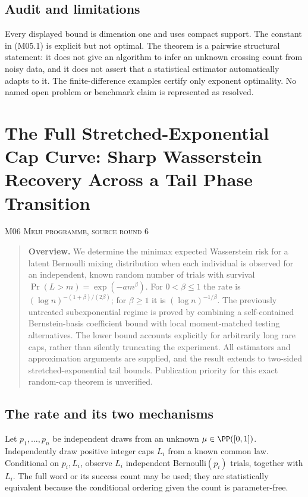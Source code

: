 \documentclass[11pt,a4paper]{article}
\theoremstyle{definition}\newtheorem{definition}[theorem]{Definition}
\theoremstyle{remark}\newtheorem{remark}[theorem]{Remark}
\numberwithin{equation}{section}
\begin{document}
\subsection{Audit and limitations}\label{M05-sec-6}
Every displayed bound is dimension one and uses compact support. The constant in (M05.1) is explicit but not optimal. The theorem is a pairwise structural statement: it does not give an algorithm to infer an unknown crossing count from noisy data, and it does not assert that a statistical estimator automatically adapts to it. The finite-difference examples certify only exponent optimality. No named open problem or benchmark claim is represented as resolved.





\clearpage
\section[M06 --- The Full Stretched-Exponential Cap Curve: Sharp Wasserstein Recovery Across a Tail Phase Transition]{The Full Stretched-Exponential Cap Curve: Sharp Wasserstein Recovery Across a Tail Phase Transition}\label{contrib-M06}
\noindent\textsc{M06 \quad Meiji programme, source round 6}\par\medskip


\begin{quote}\small\textbf{Overview.} We determine the minimax expected Wasserstein risk for a latent Bernoulli mixing distribution when each individual is observed for an independent, known random number of trials with survival $\Pr(L>m)=\exp(-a m^\beta)$. For $0<\beta\le1$ the rate is $(\log n)^{-(1+\beta)/(2\beta)}$; for $\beta\ge1$ it is $(\log n)^{-1/\beta}$. The previously untreated subexponential regime is proved by combining a self-contained Bernstein-basis coefficient bound with local moment-matched testing alternatives. The lower bound accounts explicitly for arbitrarily long rare caps, rather than silently truncating the experiment. All estimators and approximation arguments are supplied, and the result extends to two-sided stretched-exponential tail bounds. Publication priority for this exact random-cap theorem is unverified.\end{quote}

\subsection{The rate and its two mechanisms}\label{M06-sec-1}
Let $p_1,\ldots,p_n$ be independent draws from an unknown $\mu\in\PP([0,1])$. Independently draw positive integer caps $L_i$ from a known common law. Conditional on $p_i,L_i$, observe $L_i$ independent Bernoulli$(p_i)$ trials, together with $L_i$. The full word or its success count may be used; they are statistically equivalent because the conditional ordering given the count is parameter-free.
\end{document}
